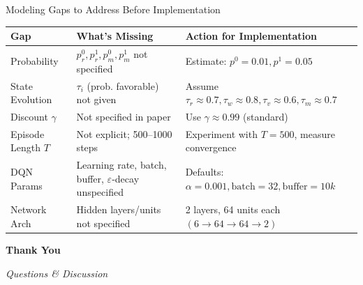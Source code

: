 \documentclass{beamer}
\begin{document}
\begin{frame}{Modeling Gaps to Address Before Implementation}
  \small
  \begin{tabular}{|p{1.3cm}|p{2.0cm}|p{5.0cm}|}
    \hline
    \textbf{Gap} & \textbf{What's Missing} & \textbf{Action for Implementation} \\
    \hline
    Probability & $p^0_r, p^1_r, p^0_m, p^1_m$ not specified & Estimate: $p^0=0.01, p^1=0.05$ \\
    \hline
    State Evolution & $\tau_i$ (prob. favorable) not given & Assume $\tau_r \approx 0.7, \tau_w \approx 0.8, \tau_v \approx 0.6, \tau_m \approx 0.7$ \\
    \hline
    Discount $\gamma$ & Not specified in paper & Use $\gamma \approx 0.99$ (standard) \\
    \hline
    Episode Length $T$ & Not explicit; 500--1000 steps & Experiment with $T=500$, measure convergence \\
    \hline
    DQN Params & Learning rate, batch, buffer, $\varepsilon$-decay unspecified & Defaults: $\alpha=0.001, \text{batch}=32, \text{buffer}=10k$ \\
    \hline
    Network Arch & Hidden layers/units not specified & 2 layers, 64 units each $(6 \to 64 \to 64 \to 2)$ \\
    \hline
  \end{tabular}
\end{frame}

{
  \begin{frame}
    \vspace{2cm}
    \begin{center}
      \Huge\textbf{Thank You}

      \vspace{3cm}

      \Large\textit{Questions \& Discussion}
    \end{center}
  \end{frame}
}
\end{document}
